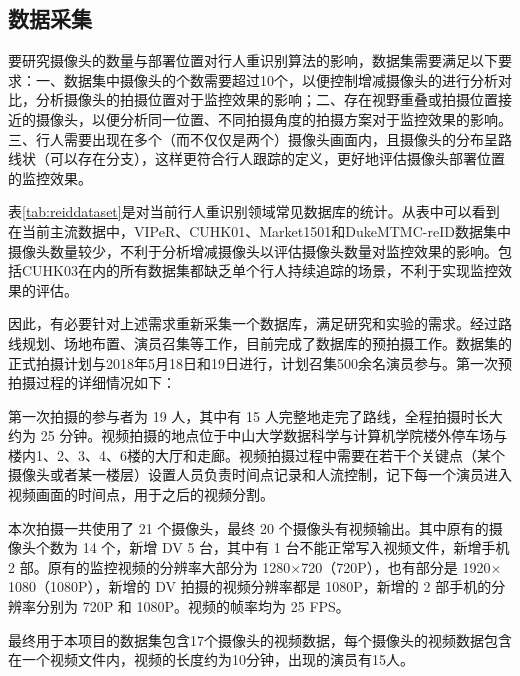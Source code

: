 \subsection{数据采集}

要研究摄像头的数量与部署位置对行人重识别算法的影响，数据集需要满足以下要求：一、数据集中摄像头的个数需要超过10个，以便控制增减摄像头的进行分析对比，分析摄像头的拍摄位置对于监控效果的影响；二、存在视野重叠或拍摄位置接近的摄像头，以便分析同一位置、不同拍摄角度的拍摄方案对于监控效果的影响。三、行人需要出现在多个（而不仅仅是两个）摄像头画面内，且摄像头的分布呈路线状（可以存在分支），这样更符合行人跟踪的定义，更好地评估摄像头部署位置的监控效果。

表\ref{tab:reiddataset}是对当前行人重识别领域常见数据库的统计。从表中可以看到在当前主流数据中，VIPeR\cite{gray2007evaluating}、CUHK01\cite{li2012human}、Market1501\cite{zheng2015scalable}和DukeMTMC-reID\cite{ristani2016MTMC}数据集中摄像头数量较少，不利于分析增减摄像头以评估摄像头数量对监控效果的影响。包括CUHK03\cite{li2014deepreid}在内的所有数据集都缺乏单个行人持续追踪的场景，不利于实现监控效果的评估。

因此，有必要针对上述需求重新采集一个数据库，满足研究和实验的需求。经过路线规划、场地布置、演员召集等工作，目前完成了数据库的预拍摄工作。数据集的正式拍摄计划与2018年5月18日和19日进行，计划召集500余名演员参与。第一次预拍摄过程的详细情况如下：

第一次拍摄的参与者为 19 人，其中有 15 人完整地走完了路线，全程拍摄时长大约为 25 分钟。视频拍摄的地点位于中山大学数据科学与计算机学院楼外停车场与楼内1、2、3、4、6楼的大厅和走廊。视频拍摄过程中需要在若干个关键点（某个摄像头或者某一楼层）设置人员负责时间点记录和人流控制，记下每一个演员进入视频画面的时间点，用于之后的视频分割。

本次拍摄一共使用了 21 个摄像头，最终 20 个摄像头有视频输出。其中原有的摄像头个数为 14 个，新增 DV 5 台，其中有 1 台不能正常写入视频文件，新增手机 2 部。原有的监控视频的分辨率大部分为 1280$\times$720（720P），也有部分是 1920$\times$1080（1080P），新增的 DV 拍摄的视频分辨率都是 1080P，新增的 2 部手机的分辨率分别为 720P 和 1080P。视频的帧率均为 25 FPS。

最终用于本项目的数据集包含17个摄像头的视频数据，每个摄像头的视频数据包含在一个视频文件内，视频的长度约为10分钟，出现的演员有15人。

